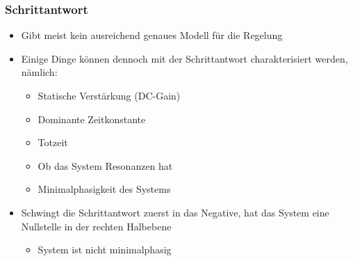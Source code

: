 \subsubsection{Schrittantwort}
\begin{itemize}
	\item Gibt meist kein ausreichend genaues Modell für die Regelung
	\item Einige Dinge können dennoch mit der Schrittantwort charakterisiert werden, nämlich:
	\begin{itemize}
		\item Statische Verstärkung (DC-Gain)
		\item Dominante Zeitkonstante
		\item Totzeit
		\item Ob das System Resonanzen hat
		\item Minimalphasigkeit des Systems
	\end{itemize}
	\item Schwingt die Schrittantwort zuerst in das Negative, hat das System eine Nullstelle in der rechten Halbebene
	\begin{itemize}
		\item System ist nicht minimalphasig
	\end{itemize}
\end{itemize}

